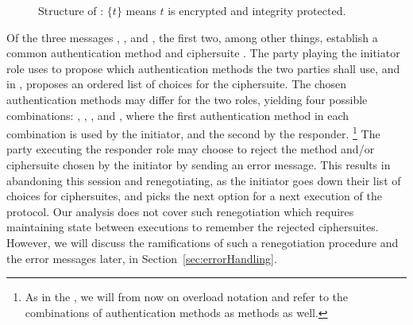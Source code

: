 \documentclass[runningheads]{llncs}
\begin{document}
%
\begin{figure}[ht]
\centering
{}
    \caption{Structure of \mEdhoc{}: $\{t\}$ means $t$ is encrypted and integrity
protected.~\cite{Norr21}}
\label{fig:edhocFramework}
\end{figure}
%
Of the three messages \mMsgone, \mMsgtwo, and \mMsgthree, the first two, among other things, establish a
common authentication method \mMethod{} and ciphersuite \mSuites{}.
%
The party playing the initiator role uses \mMethod{} to propose which
authentication methods the two parties shall use, and in \mSuites{}, proposes an ordered list
of choices for the ciphersuite.
%
The chosen authentication methods may differ for the two roles,
yielding four possible
combinations: \mSigSig{}, \mSigStat{}, \mStatSig{}, and \mStatStat{},
where the first authentication method in each combination is used by the
initiator, and the second by the responder.
\footnote{As in the \mSpec{}, we will from now on overload
notation and refer to the combinations of authentication methods as methods
as
well.}
%
The party executing the responder role may choose to reject the method and/or
ciphersuite chosen by the initiator by sending an error message.
%
This results in abandoning this session and renegotiating, as the initiator
goes down their list of choices for ciphersuites, and picks the next option for
a next execution of the protocol.
%
Our analysis does not cover such renegotiation which requires maintaining
state
between executions to remember the rejected ciphersuites.
%
However, we will discuss the ramifications of such a renegotiation procedure
and the error messages later, in Section~\ref{sec:errorHandling}.
%
\end{document}

